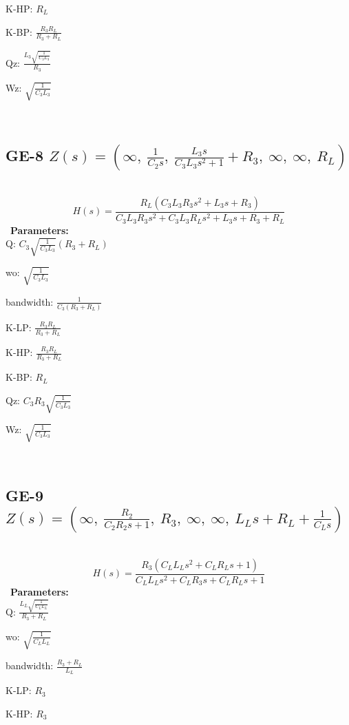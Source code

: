\documentclass{article}
\begin{document}
K-HP: $R_{L}$\ 

K-BP: $\frac{R_{3} R_{L}}{R_{3} + R_{L}}$\ 

Qz: $\frac{L_{3} \sqrt{\frac{1}{C_{3} L_{3}}}}{R_{3}}$\ 

Wz: $\sqrt{\frac{1}{C_{3} L_{3}}}$\ 

\ 

\subsection{GE-8 $Z(s) = \left( \infty, \  \frac{1}{C_{2} s}, \  \frac{L_{3} s}{C_{3} L_{3} s^{2} + 1} + R_{3}, \  \infty, \  \infty, \  R_{L}\right)$ } \ 
\textbf{\[H(s) = \frac{R_{L} \left(C_{3} L_{3} R_{3} s^{2} + L_{3} s + R_{3}\right)}{C_{3} L_{3} R_{3} s^{2} + C_{3} L_{3} R_{L} s^{2} + L_{3} s + R_{3} + R_{L}}\] } \ 
\textbf{Parameters:}\\ 

Q: $C_{3} \sqrt{\frac{1}{C_{3} L_{3}}} \left(R_{3} + R_{L}\right)$\ 

wo: $\sqrt{\frac{1}{C_{3} L_{3}}}$\ 

bandwidth: $\frac{1}{C_{3} \left(R_{3} + R_{L}\right)}$\ 

K-LP: $\frac{R_{3} R_{L}}{R_{3} + R_{L}}$\ 

K-HP: $\frac{R_{3} R_{L}}{R_{3} + R_{L}}$\ 

K-BP: $R_{L}$\ 

Qz: $C_{3} R_{3} \sqrt{\frac{1}{C_{3} L_{3}}}$\ 

Wz: $\sqrt{\frac{1}{C_{3} L_{3}}}$\ 

\ 

\subsection{GE-9 $Z(s) = \left( \infty, \  \frac{R_{2}}{C_{2} R_{2} s + 1}, \  R_{3}, \  \infty, \  \infty, \  L_{L} s + R_{L} + \frac{1}{C_{L} s}\right)$ } \ 
\textbf{\[H(s) = \frac{R_{3} \left(C_{L} L_{L} s^{2} + C_{L} R_{L} s + 1\right)}{C_{L} L_{L} s^{2} + C_{L} R_{3} s + C_{L} R_{L} s + 1}\] } \ 
\textbf{Parameters:}\\ 

Q: $\frac{L_{L} \sqrt{\frac{1}{C_{L} L_{L}}}}{R_{3} + R_{L}}$\ 

wo: $\sqrt{\frac{1}{C_{L} L_{L}}}$\ 

bandwidth: $\frac{R_{3} + R_{L}}{L_{L}}$\ 

K-LP: $R_{3}$\ 

K-HP: $R_{3}$\ 
\end{document}
